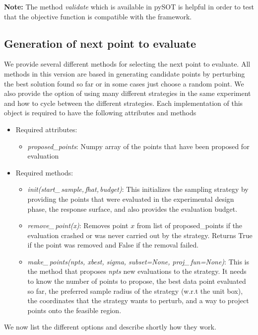 \documentclass[]{article}
\begin{document}
\textbf{Note:} The method \textit{validate} which is available in pySOT is helpful 
in order to test that the objective function is compatible with the framework. \newline

\subsection{Generation of next point to evaluate} 
\label{search}
We provide several different methods for selecting the next point to evaluate. All 
methods in this version are based in generating candidate points by perturbing the 
best solution found so far or in some cases just choose a random point. We also 
provide the option of using many different strategies in the same experiment and 
how to cycle between the different strategies. Each implementation of this object 
is required to have the following attributes and methods
\begin{itemize}
\item[] {Required attributes}:
\begin{itemize}
\item \textit{proposed\_points}: Numpy array of the points that have been proposed 
for evaluation
\end{itemize}
\item[] {Required methods}:
\begin{itemize}
\item \textit{init(start\_\,sample,\,fhat,\,budget)}: This initializes the sampling strategy 
by providing the points that were evaluated in the experimental design phase, the 
response surface, and also provides  the evaluation budget.
\item \textit{remove\_\,point(x)}: Removes point $x$ from list of proposed\_points if 
the evaluation crashed or was never carried out by the strategy. Returns True if the 
point was removed and False if the removal failed.
\item \textit{make\_\,points(npts, xbest, sigma, subset=None, proj\_\,fun=None)}: 
This is the method that proposes \textit{npts} new evaluations to the strategy. It 
needs to know the number of points to propose, the best data point evaluated so 
far, the preferred sample radius of the strategy (w.r.t the unit box), the coordinates 
that the strategy wants to perturb, and a way to project points onto the feasible region. 
\end{itemize}
\end{itemize}
We now list the different options and describe shortly how they work.
\end{document}
